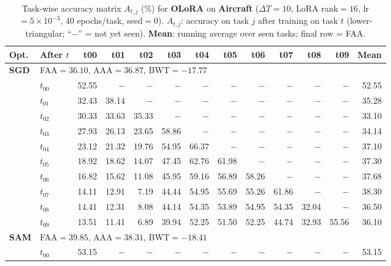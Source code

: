 \begin{table}[ht]
\centering
\caption{%
  Task-wise accuracy matrix $A_{t,j}$ (\%) for \textbf{OLoRA} on \textbf{Aircraft} ($\Delta T=10$, LoRA rank$=16$, lr$=5\times10^{-3}$, 40 epochs/task, seed$=0$).
  $A_{t,j}$: accuracy on task $j$ after training on task $t$  (lower-triangular; ``$-$'' = not yet seen).
  \textbf{Mean}: running average over seen tasks; final row = FAA.
}
\label{tab:raw_olora_aircraft}
\setlength{\tabcolsep}{2.8pt}
\renewcommand{\arraystretch}{0.88}
\scriptsize
\begin{tabular}{@{}l l r r r r r r r r r r r@{}}
\toprule
\textbf{Opt.} & \textbf{After $t$} & \textbf{t00} & \textbf{t01} & \textbf{t02} & \textbf{t03} & \textbf{t04} & \textbf{t05} & \textbf{t06} & \textbf{t07} & \textbf{t08} & \textbf{t09} & \textbf{Mean} \\
\midrule
\multirow{11}{*}{\textbf{SGD}} & \multicolumn{12}{l}{\quad\small FAA$=36.10$,\; AAA$=36.87$,\; BWT$=-17.77$} \\
 & $t_{00}$ & 52.55 & $-$ & $-$ & $-$ & $-$ & $-$ & $-$ & $-$ & $-$ & $-$ & 52.55 \\
 & $t_{01}$ & 32.43 & 38.14 & $-$ & $-$ & $-$ & $-$ & $-$ & $-$ & $-$ & $-$ & 35.28 \\
 & $t_{02}$ & 30.33 & 33.63 & 35.33 & $-$ & $-$ & $-$ & $-$ & $-$ & $-$ & $-$ & 33.10 \\
 & $t_{03}$ & 27.93 & 26.13 & 23.65 & 58.86 & $-$ & $-$ & $-$ & $-$ & $-$ & $-$ & 34.14 \\
 & $t_{04}$ & 23.12 & 21.32 & 19.76 & 54.95 & 66.37 & $-$ & $-$ & $-$ & $-$ & $-$ & 37.10 \\
 & $t_{05}$ & 18.92 & 18.62 & 14.07 & 47.45 & 62.76 & 61.98 & $-$ & $-$ & $-$ & $-$ & 37.30 \\
 & $t_{06}$ & 16.82 & 15.62 & 11.08 & 45.95 & 59.16 & 56.89 & 58.26 & $-$ & $-$ & $-$ & 37.68 \\
 & $t_{07}$ & 14.11 & 12.91 & 7.19 & 44.44 & 54.95 & 55.69 & 55.26 & 61.86 & $-$ & $-$ & 38.30 \\
 & $t_{08}$ & 14.41 & 12.31 & 8.08 & 44.14 & 54.35 & 53.89 & 54.95 & 54.35 & 32.04 & $-$ & 36.50 \\
 & $t_{09}$ & 13.51 & 11.41 & 6.89 & 39.94 & 52.25 & 51.50 & 52.25 & 44.74 & 32.93 & 55.56 & 36.10 \\
\midrule
\multirow{11}{*}{\textbf{SAM}} & \multicolumn{12}{l}{\quad\small FAA$=39.85$,\; AAA$=38.31$,\; BWT$=-18.41$} \\
 & $t_{00}$ & 53.15 & $-$ & $-$ & $-$ & $-$ & $-$ & $-$ & $-$ & $-$ & $-$ & 53.15 \\

\end{tabular}
\end{table}
